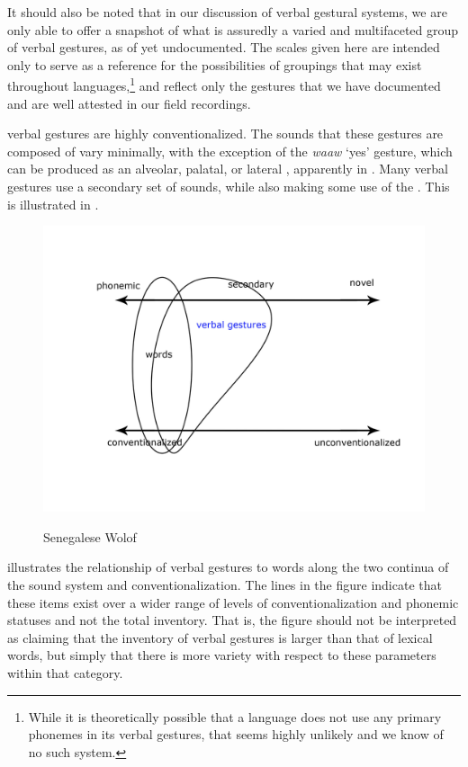 \documentclass[output=paper,newtxmath,modfonts,nonflat,hidelinks]{langsci/langscibook}
\begin{document}
It should also be noted that in our discussion of verbal gestural systems, we are only able to offer a snapshot of what is  assuredly a varied and multifaceted group of verbal gestures, as of yet undocumented. The scales given here are intended only to serve as a reference for the possibilities of groupings that may exist throughout languages,\footnote{While it is theoretically possible that a language does not use any primary phonemes in its verbal gestures,  that seems highly unlikely and we know of no such system.} and reflect only the gestures that we have documented and are well attested in our field recordings. 

 verbal gestures are highly conventionalized. The sounds that these gestures are composed of vary minimally, with the exception of the \textit{waaw} `yes' gesture, which can be produced as an alveolar, palatal, or lateral , apparently in . Many  verbal gestures use a secondary set of sounds, while also making some use of the . This is illustrated in .  
	
\begin{figure}  
\includegraphics[scale=0.13]{figures/senegalsystem.jpg}\\
\caption{Senegalese Wolof}
\label{fig:pillion:senegal}
\end{figure}
\noindent
{} illustrates the relationship of verbal gestures to words along the two continua of the sound system and conventionalization.  The lines in the figure indicate that these items exist over a wider range of levels of conventionalization and phonemic statuses and not the total inventory. That is, the figure should not be interpreted as claiming that the inventory of verbal gestures is larger than that of lexical words, but simply that there is more variety with respect to these parameters within that category. 
\end{document}
